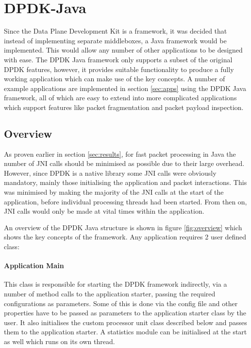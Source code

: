 \documentclass[final_report.tex]{subfiles}
\begin{document}
\section{DPDK-Java}
\label{sec:implementation}
Since the Data Plane Development Kit is a framework, it was decided that instead of implementing separate middleboxes, a Java framework would be implemented. This would allow any number of other applications to be designed with ease. The DPDK Java framework only supports a subset of the original DPDK features, however, it provides suitable functionality to produce a fully working application which can make use of the key concepts. A number of example applications are implemented in section \ref{sec:apps} using the DPDK Java framework, all of which are easy to extend into more complicated applications which support features like packet fragmentation and packet payload inspection.

\subsection{Overview}
As proven earlier in section \ref{sec:results}, for fast packet processing in Java the number of JNI calls should be minimised as possible due to their large overhead. However, since DPDK is a native library some JNI calls were obviously mandatory, mainly those initialising the application and packet interactions. This was minimised by making the majority of the JNI calls at the start of the application, before individual processing threads had been started. From then on, JNI calls would only be made at vital times within the application.

An overview of the DPDK Java structure is shown in figure \ref{fig:overview} which shows the key concepts of the framework. Any application requires 2 user defined class:

\paragraph*{Application Main} This class is responsible for starting the DPDK framework indirectly, via a number of method calls to the application starter, passing the required configurations as parameters. Some of this is done via the config file and other properties have to be passed as parameters to the application starter class by the user. It also initialises the custom processor unit class described below and passes them to the application starter. A statistics module can be initialised at the start as well which runs on its own thread.
\end{document}
